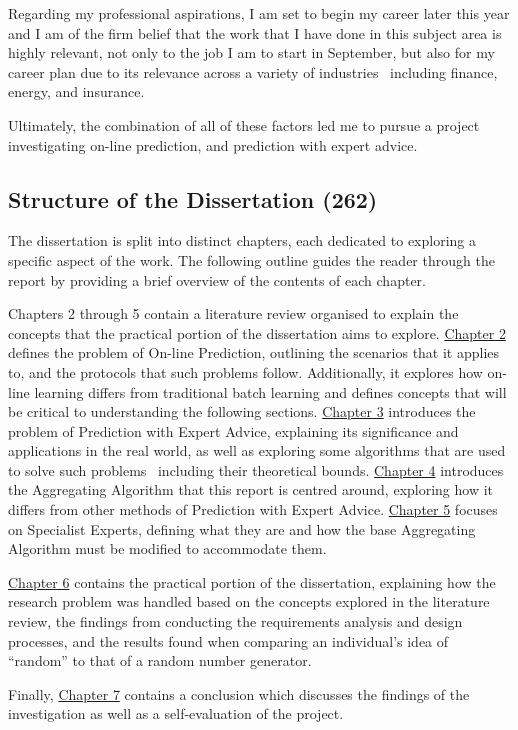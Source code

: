 Regarding my professional aspirations, I am set to begin my career later this year and I am of the firm belief that the work that I have done in this subject area is highly relevant, not only to the job I am to start in September, but also for my career plan due to its relevance across a variety of industries \textendash\ including finance, energy, and insurance.

Ultimately, the combination of all of these factors led me to pursue a project investigating on-line prediction, and prediction with expert advice.

\subsection{Structure of the Dissertation \textbf{(262)}}
The dissertation is split into distinct chapters, each dedicated to exploring a specific aspect of the work. The following outline guides the reader through the report by providing a brief overview of the contents of each chapter.

Chapters 2 through 5 contain a literature review organised to explain the concepts that the practical portion of the dissertation aims to explore. \hyperref[section:On-line_Prediction]{Chapter 2} defines the problem of On-line Prediction, outlining the scenarios that it applies to, and the protocols that such problems follow. Additionally, it explores how on-line learning differs from traditional batch learning and defines concepts that will be critical to understanding the following sections. \hyperref[section:Prediciton_with_Expert_Advice]{Chapter 3} introduces the problem of Prediction with Expert Advice, explaining its significance and applications in the real world, as well as exploring some algorithms that are used to solve such problems \textendash\ including their theoretical bounds. \hyperref[section:Aggregating_Algorithm]{Chapter 4} introduces the Aggregating Algorithm that this report is centred around, exploring how it differs from other methods of Prediction with Expert Advice. \hyperref[section:Specialist_Experts]{Chapter 5} focuses on Specialist Experts, defining what they are and how the base Aggregating Algorithm must be modified to accommodate them.

\hyperref[section:Practical]{Chapter 6} contains the practical portion of the dissertation, explaining how the research problem was handled based on the concepts explored in the literature review, the findings from conducting the requirements analysis and design processes, and the results found when comparing an individual's idea of ``random'' to that of a random number generator.

Finally, \hyperref[section:Conclusion]{Chapter 7} contains a conclusion which discusses the findings of the investigation as well as a self-evaluation of the project.